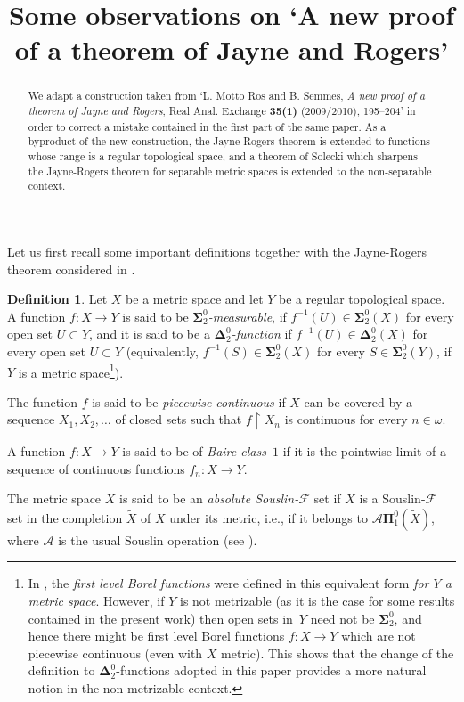 \documentclass{raex}
\title{Some observations on `A new proof of a theorem of Jayne and Rogers'}
\theoremstyle{plain}
\theoremstyle{definition}
\newtheorem*{defn*}{Definition}
\theoremstyle{remark}
\def\A{\mathcal{A}}
\def\D{\mathbf{\Delta}}
\def\S{\mathbf{\Sigma}}
\def\P{\mathbf{\Pi}}
\def\F{\mathcal{F}}
\begin{document}
\maketitle

\begin{abstract}
We adapt a construction taken from `L. Motto Ros and B. Semmes, {\em A new proof 
of a theorem of Jayne and Rogers}, Real Anal. Exchange {\bf 35(1)} (2009/2010), 
195--204' in order to correct a mistake contained in the first part of the same paper. 
As a byproduct of the new construction, the Jayne-Rogers theorem is extended to functions whose range is a regular topological space, and a theorem of Solecki which sharpens the Jayne-Rogers theorem for separable metric spaces is extended to the non-separable context.
\end{abstract}


Let us first recall some important definitions together with the Jayne-Rogers theorem 
considered in \cite{mot-sem}.

\begin{defn*}
Let $X$ be a metric space and let $Y$ be a regular topological space. A function $f \colon X\to Y$ is said to be 
\emph{$\S^0_2$-measurable}, if $f^{-1}(U)\in\S^0_2(X)$ for every open set 
$U\subset Y$, and it is said to be a \emph{$\D^0_2$-function} if $f^{-1}(U)\in\D^0_2(X)$ for every open set $U\subset Y$
(equivalently, $f^{-1}(S)\in\S^0_2(X)$ for every $S\in\S^0_2(Y)$, if $Y$ is a metric space\footnote{In \cite{jaynerogers}, the \emph{first level Borel functions} were defined in this equivalent form \emph{for $Y$ a metric space}. However, if $Y$ is not metrizable (as it is the case for some results contained in the present work) then open sets in~$Y$ need not be $\S^0_2$, and hence there might be first level Borel functions  $f \colon X \to Y$ which are not piecewise continuous (even with $X$ metric). This shows that the change of the definition to $\D^0_2$-functions adopted in this paper provides a more natural notion in the non-metrizable context.}). 

The function $f$ is said to be \emph{piecewise continuous} if $X$ can be covered by 
a sequence $X_1,X_2,\ldots$ of closed sets such that $f\restriction X_n$ is continuous 
for every $n\in\omega$.

A function $f \colon X\to Y$ is said to be of 
\emph{Baire class~$1$} if it is the pointwise 
limit of a sequence of continuous functions $f_n \colon X\to Y$.

The metric space $X$ is said to be an \emph{absolute Souslin-$\F$} set if $X$ is a Souslin-$\F$ set in the completion $\widetilde{X}$ of $X$ under its metric, i.e., if it belongs to $\A\P^0_1(\widetilde{X})$, where $\A$ is the usual Souslin operation (see \cite[Definition~25.4]{kechris}). 
\end{defn*}
\end{document}
